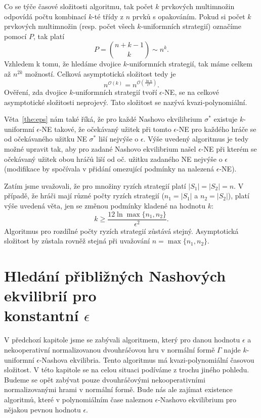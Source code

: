 \documentclass[a4paper,12pt]{article}
\begin{document}
Co se týče časové složitosti algoritmu, tak počet $k$ prvkových multimnožin odpovídá počtu kombinací $k$-té třídy z $n$ prvků s opakováním. Pokud si
počet $k$ prvkových multimnožin (resp. počet všech $k$-uniformních strategií) označíme pomocí $P$, tak platí
\begin{equation}
  P = \binom{n+k-1}{k} \sim n^k.
\end{equation}
Vzhledem k tomu, že hledáme dvojice $k$-uniformních strategií, tak máme celkem až $n^{2k}$ možností. Celková asymptotická složitost tedy je 
\begin{equation}
  n^{\mathcal{O}(k)} = n^{\mathcal{O}(\frac{\ln n}{\epsilon^2})}.
\end{equation}
Ověření, zda dvojice $k$-uniformních strategií tvoří $\epsilon$-NE,
se na celkové asymptotické složitosti neprojevý.
Tato složitost se nazývá kvazi-polynomiální.

Věta~\ref{the:eps} nám také říká, že pro každé Nashovo ekvilibrium $\sigma^*$ existuje $k$-uniformní $\epsilon$-NE takové, že očekávaný užitek 
při tomto $\epsilon$-NE pro každého hráče se od očekávaného užitku NE $\sigma^*$ liší nejvýše o $\epsilon$. Výše uvedený algoritmus je 
tedy možné upravit tak, aby pro zadané Nashovo ekvilibrium našel $\epsilon$-NE při kterém se očekávaný užitek obou hráčů liší od oč. 
užitku zadaného NE nejvýše o $\epsilon$ (modifikace by spočívala v přidání omezující podmínky na nalezená $\epsilon$-NE).

Zatím jsme uvažovali, že pro množiny ryzích strategií platí $|S_1| = |S_2| = n$. V případě, že hráči mají různé počty ryzích strategií 
($n_1 = |S_1|$ a $n_2 = |S_2|$), platí výše uvedená věta, jen se změnou podmínky kladené na hodnotu $k$:
\begin{equation}
  k \geq \frac{12\ln \max\{n_1, n_2\}}{\epsilon^2}.
\end{equation}
Algoritmus pro rozdílné počty ryzích strategií zůstává stejný. Asymptotická složitost by zůstala rovněž stejná při uvažování $n = \max\{n_1, n_2\}$.


\section{Hledání přibližných Nashových ekvilibrií pro\\ konstantní $\epsilon$}
V předchozí kapitole jsme se zabývali algoritmem, který pro danou hodnotu $\epsilon$ a nekooperativní normalizovanou dvouhráčovou hru v normální formě $\Gamma$ najde 
$k$-uniformní $\epsilon$-Nashova ekvilibria. Tento algoritmus má kvazi-polynomiální časovou složitost. V této kapitole se
na celou situaci podíváme z trochu jiného pohledu. Budeme se opět zabývat pouze dvouhráčovými nekooperativními normalizovanými hrami v normální formě.
Bude nás ale zajímat existence algoritmů, které v polynomiálním čase naleznou $\epsilon$-Nashovo ekvilibrium pro nějakou pevnou hodnotu $\epsilon$.
\end{document}
